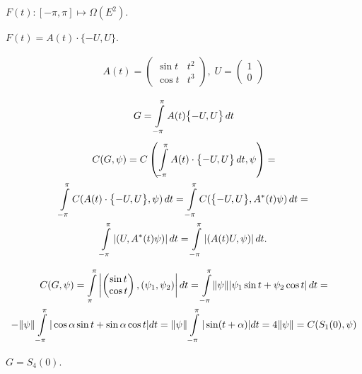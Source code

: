 \begin{exmp}
    $F(t)\colon [-\pi, \pi] \mapsto \Omega(E^2)$.

    $F(t) = A(t) \cdot \{-U, U\}$.

    \begin{gather*}
        A(t) = \left( \begin{matrix}
            \sin t & t^2 \\
            \cos t & t^3
        \end{matrix} \right), \;
        U = \left( \begin{matrix}
            1 \\
            0
        \end{matrix} \right)
    \end{gather*}

    \begin{equation*}
        G = \int\limits_{-\pi}^{\pi} A(t)\bigl\{ -U, U \bigr\} \, dt
    \end{equation*}
    \begin{gather*}
        C(G, \psi) =
        C\left( \int\limits_{-\pi}^{\pi} A(t) \cdot \bigl\{ -U, U \bigr\} \, dt, \psi \right) = \\
        \int\limits_{-\pi}^{\pi} C(A(t) \cdot \bigl\{ -U, U \bigr\}, \psi) \, dt = 
        \int\limits_{-\pi}^{\pi} C(\bigl\{ -U, U \bigr\}, A^{*}(t)\psi) \, dt = \\
        \int\limits_{-\pi}^{\pi} |(U,  A^{*}(t)\psi) | \, dt =
        \int\limits_{-\pi}^{\pi} |(A(t) U, \psi)| \, dt.
    \end{gather*}

    \begin{gather*}
        C(G, \psi) = \int\limits_{\pi}^{\pi} \left| \left( \begin{matrix}
            \sin t \\
            \cos t
        \end{matrix} \right), (\psi_1, \psi_2) \right| dt = 
        \int\limits_{-\pi}^{\pi} \lVert \psi \rVert |\psi_1 \sin t + \psi_2 \cos t| \, dt = \\
        - \lVert \psi \rVert \int\limits_{-\pi}^{\pi} |\cos \alpha \sin t + \sin \alpha \cos t| dt = 
        \lVert \psi \rVert \int\limits_{-\pi}^{\pi} |\sin (t + \alpha)| dt =
        4 \lVert \psi \rVert = 
        C(S_1(0), \psi)
    \end{gather*}

    $G = S_{4}(0)$.
\end{exmp}

